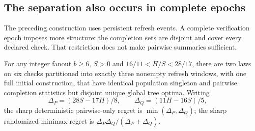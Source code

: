 \subsection{The separation also occurs in complete epochs}
The preceding construction uses persistent refresh events. A complete
verification epoch imposes more structure: the completion sets are disjoint
and cover every declared check. That restriction does not make pairwise
summaries sufficient.

\begin{theorem}\label{thm:strict-pairwise}
For any integer fanout $b\ge6$, $S>0$ and
$16/11<H/S<28/17$, there are two laws on six checks partitioned into exactly
three nonempty refresh windows, with one full initial construction, that
have identical population singleton and pairwise completion statistics
but disjoint unique global tree optima.
Writing
\[
 \Delta_P=(28S-17H)/8,\qquad
 \Delta_Q=(11H-16S)/5,
\]
the sharp deterministic pairwise-only regret is
$\min(\Delta_P,\Delta_Q)$; the sharp randomized minimax regret is
$\Delta_P\Delta_Q/(\Delta_P+\Delta_Q)$.
\end{theorem}
